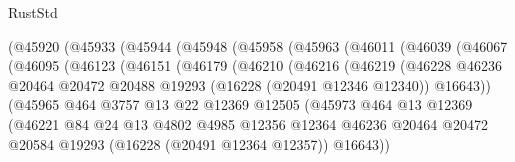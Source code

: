 \begin{lexlean}{RustStd}
\begin{coremodule}
                (@45920
                  (@45933
                    (@45944
                      (@45948
                        (@45958
                          (@45963
                            (@46011
                              (@46039
                                (@46067
                                  (@46095
                                    (@46123
                                      (@46151
                                        (@46179
                                          (@46210
                                            (@46216
                                              (@46219
                                                (@46228
                                                  @46236
                                                  @20464
                                                  @20472
                                                  @20488
                                                  @19293
                                                  (@16228 (@20491 @12346 @12340))
                                                  @16643))
                                              (@45965
                                                @464
                                                @3757
                                                @13
                                                @22
                                                @12369
                                                @12505
                                                (@45973
                                                  @464
                                                  @13
                                                  @12369
                                                  (@46221
                                                    @84
                                                    @24
                                                    @13
                                                    @4802
                                                    @4985
                                                    @12356
                                                    @12364
                                                    @46236
                                                    @20464
                                                    @20472
                                                    @20584
                                                    @19293
                                                    (@16228 (@20491 @12364 @12357))
                                                    @16643))

\end{coremodule}
\end{lexlean}
